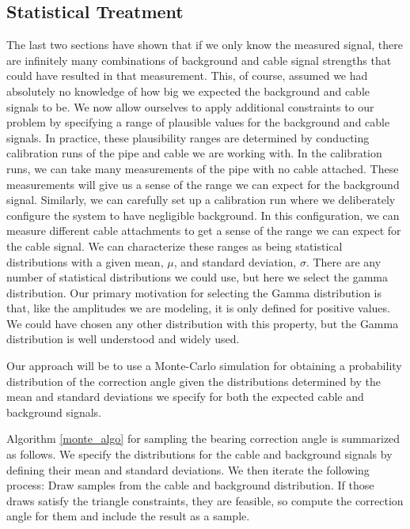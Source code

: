 \documentclass[paper=a4, fontsize=11pt]{scrartcl}
\numberwithin{equation}{section}		%
\numberwithin{figure}{section}			%
\numberwithin{table}{section}				%
\begin{document}
\begin{appendices}
\section{Statistical Treatment}
The last two sections have shown that if we only know the measured signal, there are infinitely many combinations of background and cable signal strengths that could have resulted in that measurement.  This, of course, assumed we had absolutely no knowledge of how big we expected the background and cable signals to be.  We now allow ourselves to apply additional constraints to our problem by specifying a range of plausible values for the background and cable signals.  In practice, these plausibility ranges are determined by conducting calibration runs of the pipe and cable we are working with.  In the calibration runs, we can take many measurements of the pipe with no cable attached.  These measurements will give us a sense of the range we can expect for the background signal.  Similarly, we can carefully set up a calibration run where we deliberately configure the system to have negligible background.  In this configuration, we can measure different cable attachments to get a sense of the range we can expect for the cable signal.  We can characterize these ranges as being statistical distributions with a given mean, $\mu$, and standard deviation, $\sigma$. There are any number of statistical distributions we could use, but here we select the gamma distribution.  Our primary motivation for selecting the Gamma distribution is that, like the amplitudes we are modeling, it is only defined for positive values.  We could have chosen any other distribution with this property, but the Gamma distribution is well understood and widely used. 

\par Our approach will be to use a Monte-Carlo simulation for obtaining a probability distribution of the correction angle given the distributions determined by the mean and standard deviations we specify for both the expected cable and background signals.

Algorithm \ref{monte_algo} for sampling the bearing correction angle is summarized as follows.  We specify the distributions for the cable and background signals by defining their mean and standard deviations.  We then iterate the following process:  Draw samples from the cable and background distribution.  If those draws satisfy the triangle constraints, they are feasible, so compute the correction angle for them and include the result as a sample.  


\end{appendices}
\end{document}
